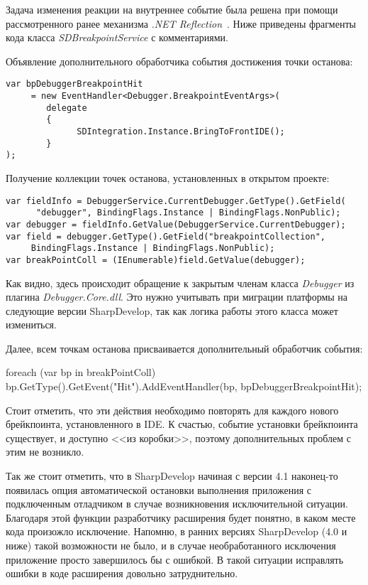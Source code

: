 Задача изменения реакции на внутреннее событие была решена при помощи рассмотренного ранее механизма {\it .NET Reflection}~\cite{CLR-via-CS}. Ниже приведены фрагменты кода класса {\it SDBreakpointService} с комментариями.

Объявление дополнительного обработчика события достижения точки останова:

\begin{lstlisting}
var bpDebuggerBreakpointHit 
     = new EventHandler<Debugger.BreakpointEventArgs>(
        delegate
        {
              SDIntegration.Instance.BringToFrontIDE();
        }
);
\end{lstlisting}


Получение коллекции точек останова, установленных в открытом проекте:	

\begin{lstlisting}
var fieldInfo = DebuggerService.CurrentDebugger.GetType().GetField(
      "debugger", BindingFlags.Instance | BindingFlags.NonPublic);
var debugger = fieldInfo.GetValue(DebuggerService.CurrentDebugger);
var field = debugger.GetType().GetField("breakpointCollection", 
     BindingFlags.Instance | BindingFlags.NonPublic);
var breakPointColl = (IEnumerable)field.GetValue(debugger);
\end{lstlisting}

Как видно, здесь происходит обращение к закрытым членам класса {\it Debugger} из плагина {\it Debugger.Core.dll}. Это нужно учитывать при миграции платформы на следующие версии SharpDevelop, так как логика работы этого класса может измениться.

Далее, всем точкам останова присваивается дополнительный обработчик события:

foreach (var bp in breakPointColl)
{
	bp.GetType().GetEvent("Hit").AddEventHandler(bp, bpDebuggerBreakpointHit);
}

Стоит отметить, что эти действия необходимо повторять для каждого нового брейкпоинта, установленного в IDE. К счастью, событие установки брейкпоинта существует, и доступно <<из коробки>>, поэтому дополнительных проблем с этим не возникло.

Так же стоит отметить, что в SharpDevelop начиная с версии 4.1 наконец-то появилась опция автоматической остановки выполнения приложения с подключенным отладчиком в случае возникновения исключительной ситуации. Благодаря этой функции разработчику расширения будет понятно, в каком месте кода произожло исключение. Напомню, в ранних версиях SharpDevelop (4.0 и ниже) такой возможности не было, и в случае необработанного исключения приложение просто завершилось бы с ошибкой. В такой ситуации исправлять ошибки в коде расширения довольно затруднительно. 

